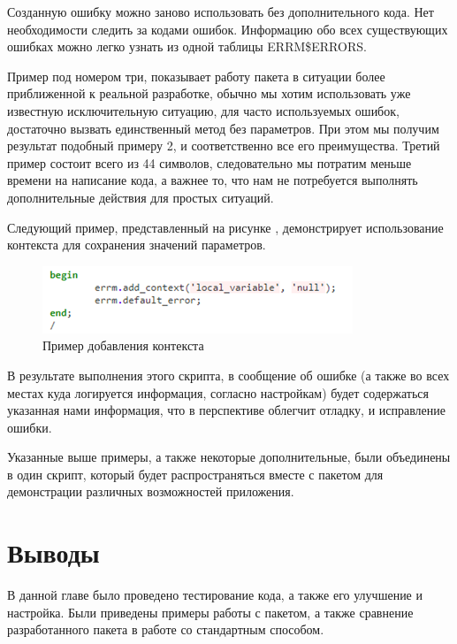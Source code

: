 Созданную ошибку можно заново использовать без дополнительного кода. Нет необходимости следить за кодами ошибок. Информацию обо всех существующих ошибках можно легко узнать из одной таблицы ERRM\$ERRORS. 

Пример под номером три, показывает работу пакета в ситуации более приближенной к реальной разработке, обычно мы хотим использовать уже известную исключительную ситуацию, для часто используемых ошибок, достаточно вызвать единственный метод без параметров. При этом мы получим результат подобный примеру 2, и соответственно все его преимущества. Третий пример состоит всего из 44 символов, следовательно мы потратим меньше времени на написание кода, а важнее то, что нам не потребуется выполнять дополнительные действия для простых ситуаций. 

Следующий пример, представленный на рисунке , демонстрирует использование контекста для сохранения значений параметров.

\begin{figure}[ht!] 
	\center
	\includegraphics [scale=1] {my_folder/img/c4_add_context_example.png}
	\caption{Пример добавления контекста} 
	\label{fig:c4_add_context_example}  
\end{figure}
\FloatBarrier

В результате выполнения этого скрипта, в сообщение об ошибке (а также во всех местах куда логируется информация, согласно настройкам) будет содержаться указанная нами информация, что в перспективе облегчит отладку, и исправление ошибки. 

Указанные выше примеры, а также некоторые дополнительные, были объединены в один скрипт, который будет распространяться вместе с пакетом для демонстрации различных возможностей приложения.



\section{Выводы} \label{ch4:conclusion}

В данной главе было проведено тестирование кода, а также его улучшение и настройка. Были приведены примеры работы с пакетом, а также сравнение разработанного пакета в работе со стандартным способом. 
